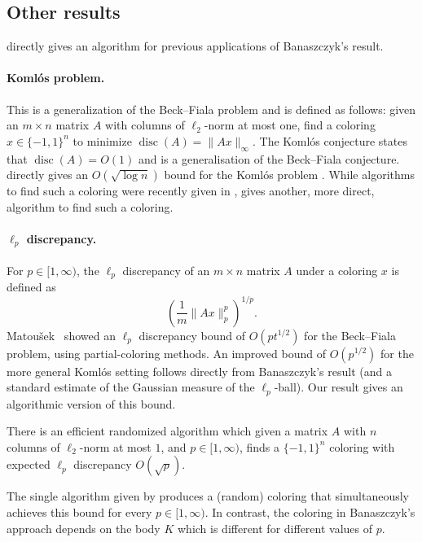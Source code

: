 \documentclass{toc}
\DeclareMathOperator{\disc}{disc}   %
\begin{document}
\subsection{Other results}
\label{sec:introapp}
 directly gives an algorithm for previous applications of Banaszczyk's result.

\paragraph{Koml\'{o}s problem.} This is a generalization of the Beck--Fiala problem and is defined as follows: given an $m\times n$ matrix $A$ with columns of $\ell_2$-norm at most one, find a coloring $x\in\{-1,1\}^n$ to minimize $\disc(A)=\| Ax\|_\infty$.
The Koml\'{o}s conjecture \cite{spencerbook} states that $\disc(A)=O(1)$ and is a generalisation of the Beck--Fiala conjecture.
%
 directly gives an $O(\sqrt{\log n})$ bound for the Koml\'{o}s problem \cite{B97}. While algorithms to find such a coloring were recently given in \cite{BDG16,BG17,harish17},  gives another, more direct, algorithm to find such a coloring.


\paragraph{$\ell_p$ discrepancy.} For $p\in[1,\infty)$, the $\ell_p$ discrepancy of an $m\times n$ matrix $A$ under a coloring $x$ is defined as
\[
  \left( \frac{1}{m} \| Ax\|_p^p \right)^{1/p}.
\]
Matou\v{s}ek~\cite{matouseklp} showed an $\ell_p$ discrepancy bound of
$O(p t^{1/2})$ for the Beck--Fiala problem, using partial-coloring
methods. An improved bound of $O(p^{1/2})$ for the more general
Koml\'os setting follows directly from Banaszczyk's result (and a
standard estimate of the Gaussian measure of the $\ell_p$-ball). Our
result gives an algorithmic version of this bound.
\begin{corollary}
\label{thm:lpdiscrepancy}
There is an efficient randomized algorithm which
given a matrix $A$ with $n$ columns of $\ell_2$-norm at most $1$, and $p\in [1,\infty)$, finds a $\{-1,1\}^n$  coloring
with expected $\ell_p$ discrepancy $O(\sqrt{p})$.
\end{corollary}

\begin{remark}
 The single algorithm given by  produces a (random) coloring that simultaneously achieves this bound for every $p\in[1,\infty)$.
In contrast, the coloring in Banaszczyk's approach depends on the body $K$ which is different for different values of $p$.
\end{remark}
\end{document}
